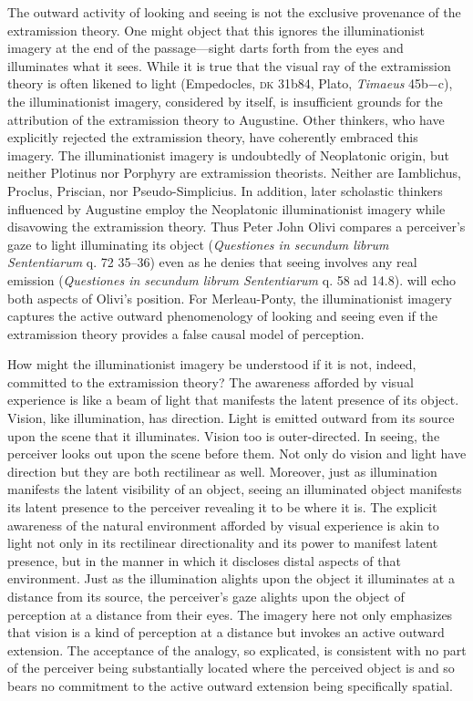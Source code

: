 \documentclass[12pt]{article}
\begin{document}
The outward activity of looking and seeing is not the exclusive provenance of the extramission theory. One might object that this ignores the illuminationist imagery at the end of the passage---sight darts forth from the eyes and illuminates what it sees. While it is true that the visual ray of the extramission theory is often likened to light (Empedocles, \textsc{dk} 31b84, Plato, \emph{Timaeus} 45b−c), the illuminationist imagery, considered by itself, is insufficient grounds for the attribution of the extramission theory to Augustine. Other thinkers, who have explicitly rejected the extramission theory, have coherently embraced this imagery. The illuminationist imagery is undoubtedly of Neoplatonic origin, but neither Plotinus nor Porphyry are extramission theorists. Neither are Iamblichus, Proclus, Priscian, nor Pseudo-Simplicius. In addition, later scholastic thinkers influenced by Augustine employ the Neoplatonic illuminationist imagery while disavowing the extramission theory. Thus Peter John Olivi compares a perceiver's gaze to light illuminating its object (\emph{Questiones in secundum librum Sententiarum} q. 72 35–36) even as he denies that seeing involves any real emission (\emph{Questiones in secundum librum Sententiarum} q. 58 ad 14.8). 
\citet[185]{Merleau-Ponty:1967fj} will echo both aspects of Olivi's position. For Merleau-Ponty, the illuminationist imagery captures the active outward phenomenology of looking and seeing even if the extramission theory provides a false causal model of perception.

How might the illuminationist imagery be understood if it is not, indeed, committed to the extramission theory? The awareness afforded by visual experience is like a beam of light that manifests the latent presence of its object. Vision, like illumination, has direction. Light is emitted outward from its source upon the scene that it illuminates. Vision too is outer-directed. In seeing, the perceiver looks out upon the scene before them. Not only do vision and light have direction but they are both rectilinear as well. Moreover, just as illumination manifests the latent visibility of an object, seeing an illuminated object manifests its latent presence to the perceiver revealing it to be where it is. The explicit awareness of the natural environment afforded by visual experience is akin to light not only in its rectilinear directionality and its power to manifest latent presence, but in the manner in which it discloses distal aspects of that environment. Just as the illumination alights upon the object it illuminates at a distance from its source, the perceiver’s gaze alights upon the object of perception at a distance from their eyes. The imagery here not only emphasizes that vision is a kind of perception at a distance but invokes an active outward extension. The acceptance of the analogy, so explicated, is consistent with no part of the perceiver being substantially located where the perceived object is and so bears no commitment to the active outward extension being specifically spatial. 
\end{document}
